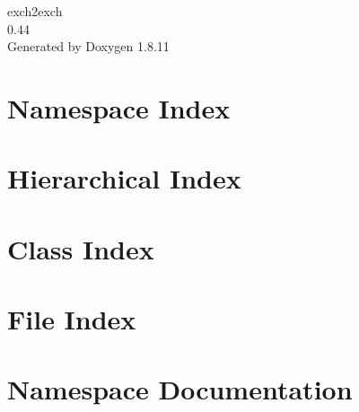 \documentclass[twoside]{book}
\newcommand{\+}{\discretionary{\mbox{\scriptsize$\hookleftarrow$}}{}{}}
\newcommand{\clearemptydoublepage}{%
  \newpage{\pagestyle{empty}\cleardoublepage}%
}
\begin{document}
\hypersetup{pageanchor=false,
             bookmarksnumbered=true,
             pdfencoding=unicode
            }
\begin{titlepage}
\vspace*{7cm}
\begin{center}%
{\Large exch2exch \\[1ex]\large 0.\+44 }\\
\vspace*{1cm}
{\large Generated by Doxygen 1.8.11}\\
\end{center}
\end{titlepage}
\clearemptydoublepage
\tableofcontents
\clearemptydoublepage
{}
\hypersetup{pageanchor=true}

\chapter{Namespace Index}

\chapter{Hierarchical Index}

\chapter{Class Index}

\chapter{File Index}

\chapter{Namespace Documentation}







\end{document}
